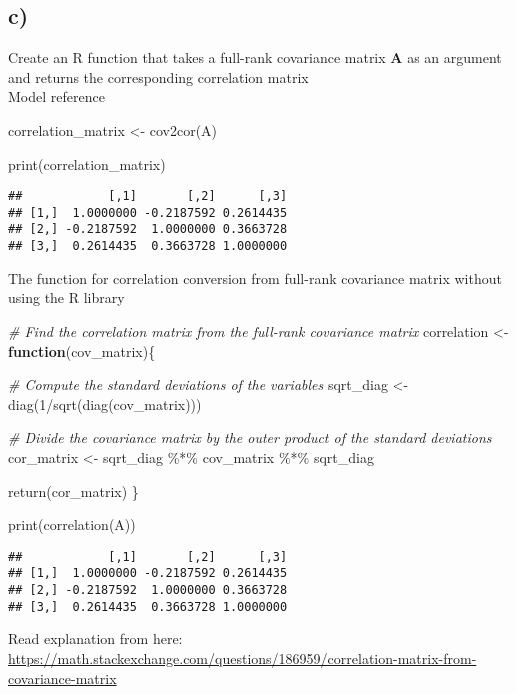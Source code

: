 \documentclass[
]{article}
\newenvironment{Shaded}{\begin{snugshade}}{\end{snugshade}}
\newcommand{\CommentTok}[1]{\textcolor[rgb]{0.56,0.35,0.01}{\textit{#1}}}
\newcommand{\ControlFlowTok}[1]{\textcolor[rgb]{0.13,0.29,0.53}{\textbf{#1}}}
\newcommand{\DecValTok}[1]{\textcolor[rgb]{0.00,0.00,0.81}{#1}}
\newcommand{\FunctionTok}[1]{\textcolor[rgb]{0.00,0.00,0.00}{#1}}
\newcommand{\NormalTok}[1]{#1}
\newcommand{\OtherTok}[1]{\textcolor[rgb]{0.56,0.35,0.01}{#1}}
\newcommand{\SpecialCharTok}[1]{\textcolor[rgb]{0.00,0.00,0.00}{#1}}
\begin{document}
\hypertarget{c}{%
\subsection{c)}\label{c}}

Create an R function that takes a full-rank covariance matrix
\(\textbf{A}\) as an argument and returns the corresponding correlation
matrix\\

Model reference\\

\begin{Shaded}
\begin{Highlighting}[]
\NormalTok{correlation\_matrix }\OtherTok{\textless{}{-}} \FunctionTok{cov2cor}\NormalTok{(A)}

\FunctionTok{print}\NormalTok{(correlation\_matrix)}
\end{Highlighting}
\end{Shaded}

\begin{verbatim}
##            [,1]       [,2]      [,3]
## [1,]  1.0000000 -0.2187592 0.2614435
## [2,] -0.2187592  1.0000000 0.3663728
## [3,]  0.2614435  0.3663728 1.0000000
\end{verbatim}

The function for correlation conversion from full-rank covariance matrix
without using the R library

\begin{Shaded}
\begin{Highlighting}[]
\CommentTok{\# Find the correlation matrix from the full{-}rank covariance matrix}
\NormalTok{correlation }\OtherTok{\textless{}{-}} \ControlFlowTok{function}\NormalTok{(cov\_matrix)\{}
  
  \CommentTok{\# Compute the standard deviations of the variables}
\NormalTok{  sqrt\_diag }\OtherTok{\textless{}{-}} \FunctionTok{diag}\NormalTok{(}\DecValTok{1}\SpecialCharTok{/}\FunctionTok{sqrt}\NormalTok{(}\FunctionTok{diag}\NormalTok{(cov\_matrix)))}
  
  \CommentTok{\# Divide the covariance matrix by the outer product of the standard deviations}
\NormalTok{  cor\_matrix }\OtherTok{\textless{}{-}}\NormalTok{ sqrt\_diag }\SpecialCharTok{\%*\%}\NormalTok{ cov\_matrix }\SpecialCharTok{\%*\%}\NormalTok{ sqrt\_diag}

  \FunctionTok{return}\NormalTok{(cor\_matrix)}
\NormalTok{\}}

\FunctionTok{print}\NormalTok{(}\FunctionTok{correlation}\NormalTok{(A))}
\end{Highlighting}
\end{Shaded}

\begin{verbatim}
##            [,1]       [,2]      [,3]
## [1,]  1.0000000 -0.2187592 0.2614435
## [2,] -0.2187592  1.0000000 0.3663728
## [3,]  0.2614435  0.3663728 1.0000000
\end{verbatim}

Read explanation from here:
\url{https://math.stackexchange.com/questions/186959/correlation-matrix-from-covariance-matrix}
\end{document}
